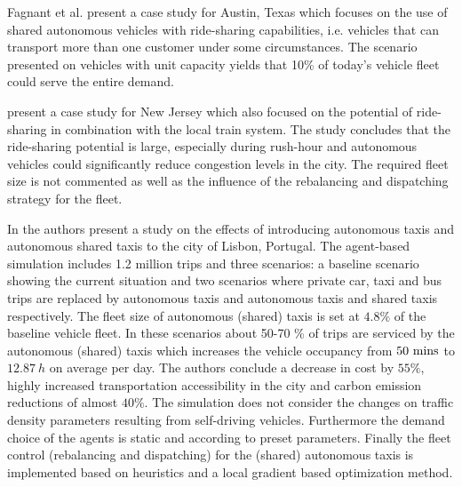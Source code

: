 Fagnant et al. \cite{fagnant2015dynamic} present a case study for Austin, Texas
which focuses on the use of shared autonomous vehicles with ride-sharing capabilities,
i.e. vehicles that can transport more than one customer under some circumstances.
The scenario presented on vehicles with unit capacity yields that 10\% of today's
vehicle fleet could serve the entire demand. %

\cite{zachariah2014uncongested} present a case study for New Jersey which also focused
on the potential of ride-sharing in combination with the local train system.
The study concludes that the ride-sharing potential
is large, especially during rush-hour and autonomous vehicles could significantly
reduce congestion levels in the city. The required fleet size is not commented
as well as the influence of the rebalancing and dispatching strategy for the fleet.

In \cite{martinez2017assessing} the authors present a study on the effects of
introducing autonomous taxis and autonomous shared taxis to the city of Lisbon,
Portugal. The agent-based simulation includes 1.2 million trips and three scenarios:
a baseline scenario showing the current situation and two scenarios where private car,
taxi and bus trips are replaced by autonomous taxis and autonomous taxis and shared
taxis respectively. The fleet size of autonomous (shared) taxis is set at $4.8\%$ of
the baseline vehicle fleet. In these scenarios about 50-70 \% of trips are serviced
by the autonomous (shared) taxis which increases the vehicle occupancy
from $50 ~ \textnormal{mins}$ to $12.87 ~ h$ on average per day. The authors conclude
a decrease in cost by $55 \%$, highly increased transportation
accessibility in the city and carbon emission reductions of almost $40\%$. The
simulation does not consider the changes on traffic density parameters resulting
from self-driving vehicles. Furthermore the demand choice of the agents is static
and according to preset parameters. Finally the fleet control (rebalancing and dispatching)
for the (shared) autonomous taxis is implemented based on heuristics and a local
gradient based optimization method.

